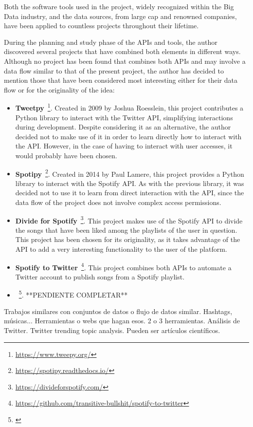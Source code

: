 
\nonzeroparskip Both the software tools used in the project, widely recognized within the Big Data industry, and the data sources, from large cap and renowned companies, have been applied to countless projects throughout their lifetime.

\nonzeroparskip During the planning and study phase of the APIs and tools, the author discovered several projects that have combined both elements in different ways. Although no project has been found that combines both APIs and may involve a data flow similar to that of the present project, the author has decided to mention those that have been considered most interesting either for their data flow or for the originality of the idea:

\begin{itemize}
	\item \textbf{Tweetpy}~\footnote{\url{https://www.tweepy.org/}}. Created in 2009 by Joshua Roesslein, this project contributes a Python library to interact with the Twitter API, simplifying interactions during development. Despite considering it as an alternative, the author decided not to make use of it in order to learn directly how to interact with the API. However, in the case of having to interact with user accesses, it would probably have been chosen.
	\item \textbf{Spotipy}~\footnote{\url{https://spotipy.readthedocs.io/}}. Created in 2014 by Paul Lamere, this project provides a Python library to interact with the Spotify API. As with the previous library, it was decided not to use it to learn from direct interaction with the API, since the data flow of the project does not involve complex access permissions.
	\item \textbf{Divide for Spotify}~\footnote{\url{https://divideforspotify.com/}}. This project makes use of the Spotify API to divide the songs that have been liked among the playlists of the user in question. This project has been chosen for its originality, as it takes advantage of the API to add a very interesting functionality to the user of the platform.
	\item \textbf{Spotify to Twitter}~\footnote{\url{https://github.com/transitive-bullshit/spotify-to-twitter}}. This project combines both APIs to automate a Twitter account to publish songs from a Spotify playlist.
	\item \textbf{}~\footnote{\url{}}.  **PENDIENTE COMPLETAR**
\end{itemize}

Trabajos similares con conjuntos de datos o flujo de datos similar. Hashtags, músicas... Herramientas o webs que hagan esos. 2 o 3 herramientas. Análisis de Twitter. Twitter trending topic analysis. Pueden ser artículos científicos.